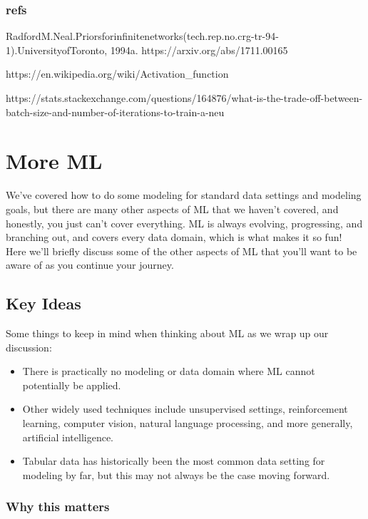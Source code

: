\documentclass[
  letterpaper,
]{krantz}
\providecommand{\tightlist}{%
  \setlength{\itemsep}{0pt}\setlength{\parskip}{0pt}}\usepackage{longtable,booktabs,array}
\begin{document}
\subsection{refs}\label{refs-2}

RadfordM.Neal.Priorsforinfinitenetworks(tech.rep.no.crg-tr-94-1).UniversityofToronto,
1994a. https://arxiv.org/abs/1711.00165

https://en.wikipedia.org/wiki/Activation\_function

https://stats.stackexchange.com/questions/164876/what-is-the-trade-off-between-batch-size-and-number-of-iterations-to-train-a-neu

\chapter{More ML}\label{sec-ml-more}

We've covered how to do some modeling for standard data settings and
modeling goals, but there are many other aspects of ML that we haven't
covered, and honestly, you just can't cover everything. ML is always
evolving, progressing, and branching out, and covers every data domain,
which is what makes it so fun! Here we'll briefly discuss some of the
other aspects of ML that you'll want to be aware of as you continue your
journey.

\section{Key Ideas}\label{key-ideas-3}

Some things to keep in mind when thinking about ML as we wrap up our
discussion:

\begin{itemize}
\tightlist
\item
  There is practically no modeling or data domain where ML cannot
  potentially be applied.
\item
  Other widely used techniques include unsupervised settings,
  reinforcement learning, computer vision, natural language processing,
  and more generally, artificial intelligence.
\item
  Tabular data has historically been the most common data setting for
  modeling by far, but this may not always be the case moving forward.
\end{itemize}

\subsection{Why this matters}\label{why-this-matters-2}
\end{document}
